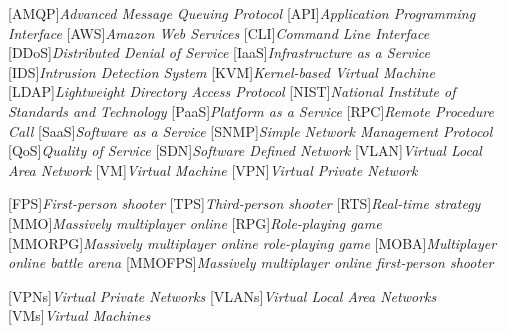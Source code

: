 \begin{acronym}[]
	[AMQP]{{\it Advanced Message Queuing Protocol}}
	[API]{{\it Application Programming Interface}}
    [AWS]{{\it Amazon Web Services}}
	[CLI]{{\it Command Line Interface}}
	[DDoS]{{\it Distributed Denial of Service}}
	[IaaS]{{\it Infrastructure as a Service}}
    [IDS]{{\it Intrusion Detection System}}
	[KVM]{{\it Kernel-based Virtual Machine}}
    [LDAP]{{\it Lightweight Directory Access Protocol}}
	[NIST]{{\it National Institute of Standards and Technology}}
	[PaaS]{{\it Platform as a Service}}
    [RPC]{{\it Remote Procedure Call}}
	[SaaS]{{\it Software as a Service}}
	[SNMP]{{\it Simple Network Management Protocol}}
	[QoS]{{\it Quality of Service}}
	[SDN]{{\it Software Defined Network}}
	[VLAN]{{\it Virtual Local Area Network}}
	[VM]{{\it Virtual Machine}}
	[VPN]{{\it Virtual Private Network}}

	[FPS]{{\it First-person shooter}}
	[TPS]{{\it Third-person shooter}}
	[RTS]{{\it Real-time strategy}}
	[MMO]{{\it Massively multiplayer online}}
	[RPG]{{\it Role-playing game}}
	[MMORPG]{{\it Massively multiplayer online role-playing game}}
	[MOBA]{{\it Multiplayer online battle arena}}
	[MMOFPS]{{\it Massively multiplayer online first-person shooter}}

	[VPNs]{{\it Virtual Private Networks}}
	[VLANs]{{\it Virtual Local Area Networks}}
	[VMs]{{\it Virtual Machines}}
\end{acronym}

